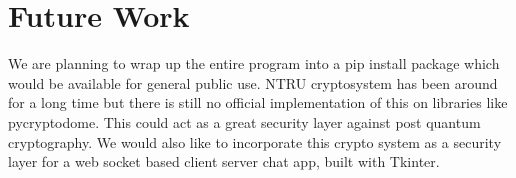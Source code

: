 \documentclass[a4paper,12pt]{article}
\begin{document}
\section{Future Work}
\begin{flushleft}
We are planning to wrap up the entire program into a pip install package which would be available for general public use. NTRU cryptosystem has been around for a long time but there is still no official implementation of this on libraries like pycryptodome. This could act as a great security layer against post quantum cryptography. We would also like to incorporate this crypto system as a security layer for a web socket based client server chat app, built with Tkinter.
\end{flushleft}
\newpage


\end{document}
